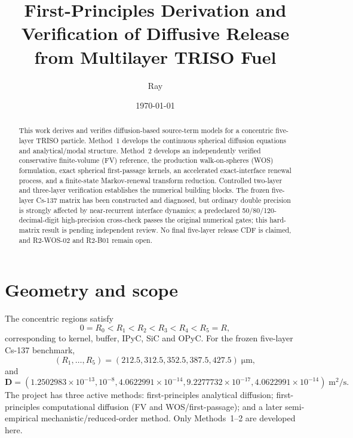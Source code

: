 \documentclass[11pt]{article}
\title{First-Principles Derivation and Verification of Diffusive Release from Multilayer TRISO Fuel}
\author{Ray}
\date{\today}
\begin{document}
\maketitle

\begin{abstract}
This work derives and verifies diffusion-based source-term models for a concentric five-layer TRISO particle. Method~1 develops the continuous spherical diffusion equations and analytical/modal structure. Method~2 develops an independently verified conservative finite-volume (FV) reference, the production walk-on-spheres (WOS) formulation, exact spherical first-passage kernels, an accelerated exact-interface renewal process, and a finite-state Markov-renewal transform reduction. Controlled two-layer and three-layer verification establishes the numerical building blocks. The frozen five-layer Cs-137 matrix has been constructed and diagnosed, but ordinary double precision is strongly affected by near-recurrent interface dynamics; a predeclared 50/80/120-decimal-digit high-precision cross-check passes the original numerical gates; this hard-matrix result is pending independent review. No final five-layer release CDF is claimed, and R2-WOS-02 and R2-B01 remain open.
\end{abstract}

\section{Geometry and scope}
The concentric regions satisfy
\begin{equation}
0=R_0<R_1<R_2<R_3<R_4<R_5=R,
\end{equation}
corresponding to kernel, buffer, IPyC, SiC and OPyC. For the frozen five-layer Cs-137 benchmark,
\begin{equation}
(R_1,\ldots,R_5)=(212.5,312.5,352.5,387.5,427.5)\;\si{\micro\metre},
\end{equation}
and
\begin{equation}
\bm D=(1.2502983\times10^{-13},10^{-8},4.0622991\times10^{-14},
9.2277732\times10^{-17},4.0622991\times10^{-14})\;\si{\metre\squared\per\second}.
\end{equation}
The project has three active methods: first-principles analytical diffusion; first-principles computational diffusion (FV and WOS/first-passage); and a later semi-empirical mechanistic/reduced-order method. Only Methods~1--2 are developed here.
\end{document}
